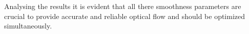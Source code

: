 Analysing the results it is evident that all there smoothness parameters are crucial to provide  accurate and reliable optical flow and should be optimized simultaneously.


%  
%  







